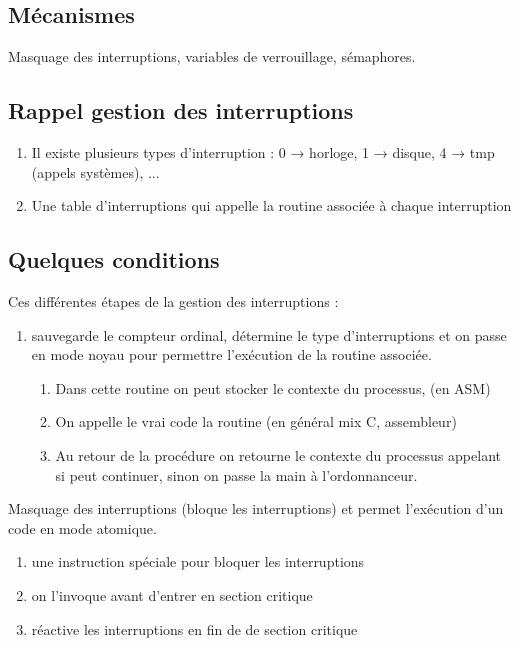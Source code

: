 \documentclass[11pt, a4paper]{article}
\begin{document}
\subsection{Mécanismes}

Masquage des interruptions, variables de verrouillage, sémaphores.

\subsection{Rappel gestion des interruptions}

\begin{enumerate}
\item Il existe plusieurs types d'interruption : 0 → horloge, 1 → disque, 4 → tmp (appels systèmes), ...
\item Une table d'interruptions qui appelle la routine associée à chaque interruption
\end{enumerate}

\subsection{Quelques conditions}

Ces différentes étapes de la gestion des interruptions :

\begin{enumerate}
\item sauvegarde le compteur ordinal, détermine le type d'interruptions et on passe en mode noyau pour permettre l'exécution de la routine associée.
    \begin{enumerate}
    \item Dans cette routine on peut stocker le contexte du processus, (en ASM)
    \item On appelle le vrai code la routine (en général mix C, assembleur)
    \item Au retour de la procédure on retourne le contexte du processus appelant si peut continuer, sinon on passe la main à l'ordonnanceur.
    \end{enumerate}
\end{enumerate}

Masquage des interruptions (bloque les interruptions) et permet l'exécution d'un code en mode atomique.

\begin{enumerate}
\item une instruction spéciale pour bloquer les interruptions
\item on l'invoque avant d'entrer en section critique
\item réactive les interruptions en fin de de section critique
\end{enumerate}
\end{document}

